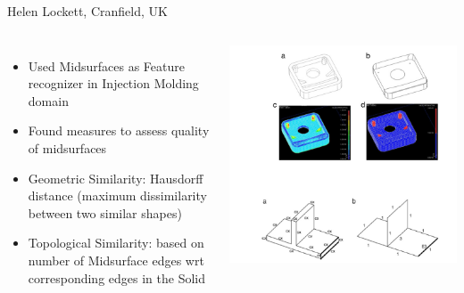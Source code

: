 \begin{frame}[<+-| alert@+>]{Helen Lockett, Cranfield, UK \cite{Lockett2008}}

\begin{columns}[T]


	\begin{itemize}[noitemsep,label=\textbullet,topsep=2pt,parsep=2pt,partopsep=2pt]
	\item Used Midsurfaces as Feature recognizer in Injection Molding domain
	\item Found measures to assess quality of midsurfaces
	\item Geometric Similarity: Hausdorff distance (maximum dissimilarity between two similar shapes)
	\item Topological Similarity:  based on number of Midsurface edges wrt corresponding edges in the Solid
	\end{itemize}

	\includegraphics[scale=0.4]{../Common/images/Lockett.png}
\end{columns}

\end{frame}

